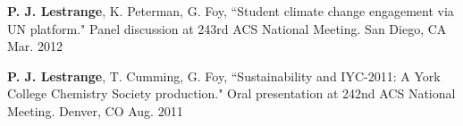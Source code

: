 \begin{cvpresentations}

\cvpresentation
{\textbf{P. J. Lestrange}, K. Peterman, G. Foy, ``Student climate change engagement via UN platform." Panel discussion at 243rd ACS National Meeting.} %
{San Diego, CA} %
{Mar. 2012} %


\cvpresentation
{\textbf{P. J. Lestrange}, T. Cumming, G. Foy, ``Sustainability and IYC-2011: A York College Chemistry Society production." Oral presentation at 242nd ACS National Meeting.} %
{Denver, CO} %
{Aug. 2011} %


\end{cvpresentations}